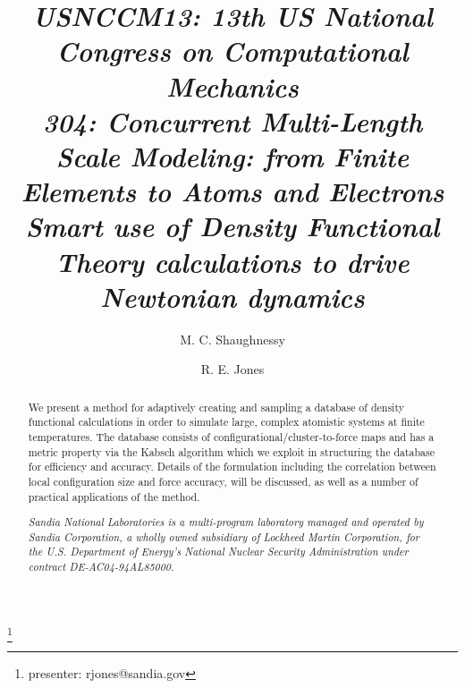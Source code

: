 \documentclass[12pt]{revtex4-1}
\begin{document}
\vskip 1.0in

\title{
\small \it USNCCM13: 13th US National Congress on Computational Mechanics \\
\tiny \it 304: Concurrent Multi-Length Scale Modeling: from Finite Elements to Atoms and Electrons \\
\normalsize \bf
Smart use of Density Functional Theory calculations to drive Newtonian dynamics
}
\author{M. C. Shaughnessy}
\author{R. E. Jones}\thanks{presenter: rjones@sandia.gov} 

\vskip 0.5in

\begin{abstract}


We present a method for adaptively creating and sampling a database of density functional calculations in order to simulate large, complex atomistic systems at finite temperatures. 
The database consists of configurational/cluster-to-force maps and has a metric property via the Kabsch algorithm which we exploit in structuring the database for efficiency and accuracy. 
Details of the formulation including the correlation between local configuration size and force accuracy, will be discussed, as well as a number of practical applications of the method.


\vskip 0.5in

\small
\it
Sandia National Laboratories is a multi-program laboratory managed and operated by Sandia Corporation, a wholly owned subsidiary of Lockheed Martin Corporation, for the U.S. Department of Energy's National Nuclear Security Administration under contract DE-AC04-94AL85000.

\end{abstract}

\maketitle
\end{document}
